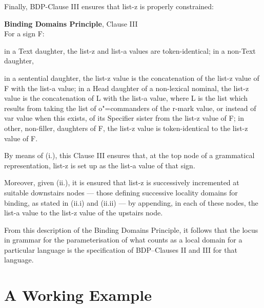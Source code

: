 \documentclass[output=paper
,modfonts
,nonflat]{langsci/langscibook}
\begin{document}
Finally, BDP-Clause III ensures that {\sc list-z} is properly
constrained:

\begin{samepage}
\begin{exe}
\ex
\textbf{Binding Domains Principle}, Clause III\\
For a sign F:
\begin{xlisti}
\ex	in a Text daughter, the {\sc list-z} and {\sc list-a} values are token-identical;
\ex	in a non-Text daughter,
\begin{xlisti} 
\ex in a sentential daughter, the {\sc list-z} value is the concatenation of the {\sc
list-z} value of F with the {\sc list-a} value; 
\ex in a Head daughter of a non-lexical nominal, the {\sc list-z} value is the concatenation of L
with the {\sc list-a} value, where L is the list which results from taking the list of
o"=commanders of the {\sc r-mark} value, or instead of {\sc var} value when this exists,
of its Specifier sister from the {\sc list-z} value of F;
\ex in other, non-filler, daughters of F, the {\sc list-z} value is token-iden\-ti\-cal to
the {\sc list-z} value of F.
\end{xlisti}
\end{xlisti}

\end{exe}
\end{samepage}

By means of (i.), this Clause III ensures that, at the top
node of a grammatical representation, {\sc list-z} is set up as the
{\sc list-a} value of that sign. 

Moreover, given (ii.), it is ensured that {\sc list-z} is successively
incremented at suitable downstairs nodes --- those defining
successive locality domains for binding, as stated in (ii.i) and
(ii.ii) --- by appending, 
in each of these nodes, the {\sc list-a} value to the {\sc list-z} value
of the upstairs node.

From this description of the Binding Domains Principle, it follows 
that the locus in grammar for the parameterisation 
of what counts as a local domain for a particular language is 
the specification of BDP--Clauses II and III for that language.



\section{A Working Example \label{verif}}
\end{document}
